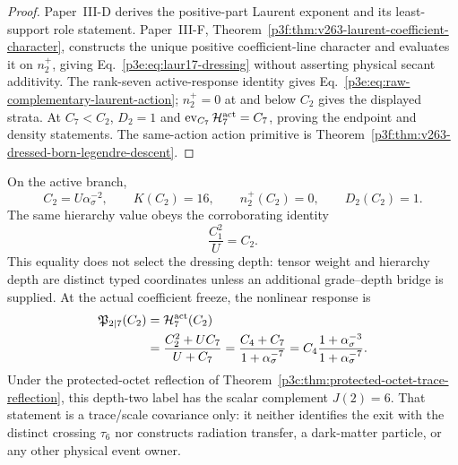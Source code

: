 \documentclass[11pt,a4paper]{article}
\begin{document}
\begin{proof}
Paper~III-D derives the positive-part Laurent exponent and its least-support
role statement.  Paper~III-F,
Theorem~\ref{p3f:thm:v263-laurent-coefficient-character}, constructs the
unique positive coefficient-line character and evaluates it on
\(n_2^+\), giving Eq.~\eqref{p3e:eq:laur17-dressing} without asserting
physical secant additivity.  The rank-seven active-response identity gives
Eq.~\eqref{p3e:eq:raw-complementary-laurent-action}; \(n_2^+=0\) at and below
\(C_2\) gives the displayed strata.  At \(C_7<C_2\), \(D_2=1\) and
\(\operatorname{ev}_{C_7}\mathcal H_7^{\rm act}=C_7\), proving the endpoint
and density statements.  The same-action action primitive is
Theorem~\ref{p3f:thm:v263-dressed-born-legendre-descent}.
\end{proof}

\begin{corollary}
\label{p3e:cor:rank-one-exit-quadratic-grade}
On the active branch,
\begin{equation}
\label{p3e:eq:rank-one-exit-depth-two-scale}
 \boxed{C_2=U\alpha_\sigma^{-2},\qquad K(C_2)=16,
 \qquad n_2^+(C_2)=0,\qquad D_2(C_2)=1.}
\end{equation}
The same hierarchy value obeys the corroborating identity
\begin{equation}
\label{p3e:eq:depth-two-corroborating-identity}
 \frac{C_1^2}{U}=C_2.
\end{equation}
This equality does not select the dressing depth: tensor weight and hierarchy
depth are distinct typed coordinates unless an additional grade--depth bridge
is supplied.  At the actual coefficient freeze, the nonlinear response is
\begin{align}
\label{p3e:eq:rank-one-exit-exact-response}
 \mathfrak P_{2\mid7}(C_2)
 &=\mathcal H_7^{\rm act}(C_2)\nonumber\\
 &=\frac{C_2^2+UC_7}{U+C_7}
 =\frac{C_4+C_7}{1+\alpha_\sigma^{-7}}
 =C_4\frac{1+\alpha_\sigma^{-3}}
              {1+\alpha_\sigma^{-7}}.
\end{align}
Under the protected-octet reflection of
Theorem~\ref{p3c:thm:protected-octet-trace-reflection}, this depth-two label
has the scalar complement \(J(2)=6\).  That statement is a trace/scale
covariance only: it neither identifies the exit with the distinct crossing
\(\tau_6\) nor constructs radiation transfer, a dark-matter particle, or any
other physical event owner.
\end{corollary}
\end{document}
